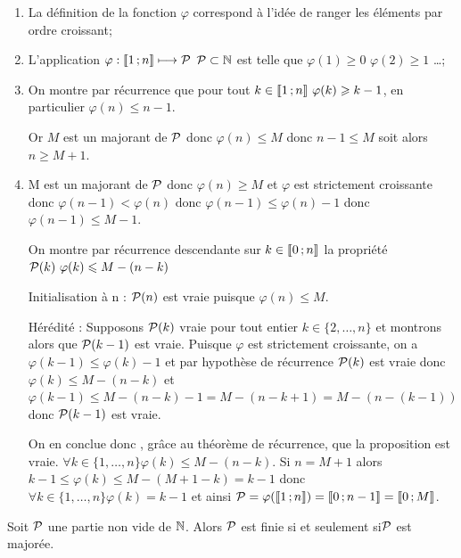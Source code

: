 \begin{enumerate}
\item La définition de la fonction \(\varphi\) correspond à l'idée de ranger les éléments par ordre croissant;
\item L'application \(\varphi:\intervalleentier{1}{n} \longmapsto \P\) \(\P \subset \N\) est telle que \(\varphi(1)\geqslant 0\) \(\varphi(2)\geqslant 1\) \ldots;
\item On montre par récurrence que pour tout \(k\in\intervalleentier{1}{n} \ \varphi(k)\geqslant k-1\), en particulier \(\varphi(n)\leqslant n-1\). 

Or \(M\) est un majorant de \(\P\) donc \(\varphi(n)\leqslant M\) donc \(n-1\leqslant M\) soit alors \(n\geqslant M+1\).
\item M est un majorant de \(\P\) donc \(\varphi(n)\geqslant M\) et \(\varphi\) est strictement croissante donc \(\varphi(n-1)<\varphi(n)\) donc \(\varphi(n-1)\leqslant\varphi(n)-1\) donc \(\varphi(n-1)\leqslant M-1\). 

On montre par récurrence descendante sur \(k\in\intervalleentier{0}{n}\) la propriété \(\P(k) \ \varphi(k)\leqslant M-(n-k)\)

Initialisation à n : \(\P(n)\) est vraie puisque \(\varphi(n)\leqslant M\).

Hérédité : Supposons \(\P(k)\) vraie pour tout entier \(k\in\{2, \ldots,n\}\) et montrons alors que \(\P(k-1)\) est vraie. Puisque \(\varphi\) est strictement croissante, on a \(\varphi(k-1)\leqslant \varphi(k)-1\) et par hypothèse de récurrence \(\P(k)\) est vraie donc \(\varphi(k)\leqslant M-(n-k)\) et \(\varphi(k-1)\leqslant M-(n-k)-1=M-(n-k+1)=M-(n-(k-1))\) donc \(\P(k-1)\) est vraie. 

On en conclue donc , grâce au théorème de récurrence, que la proposition est vraie. \(\forall k \in \{1, \ldots, n\} \varphi(k)\leqslant M-(n-k)\). Si \(n=M+1\) alors 
\(k-1\leqslant \varphi(k)\leqslant M - (M+1-k)=k-1\) donc \(\forall k \in \{1, \ldots,n\} \varphi(k)=k-1\) et ainsi \(\P=\varphi(\intervalleentier{1}{n})=\intervalleentier{0}{n-1}= \intervalleentier{0}{M}\).
\end{enumerate}
\begin{prop}
  Soit \(\P\) une partie non vide de \(\N\). Alors \(\P\) est finie si et seulement si\(\P\) est majorée.
\end{prop}
